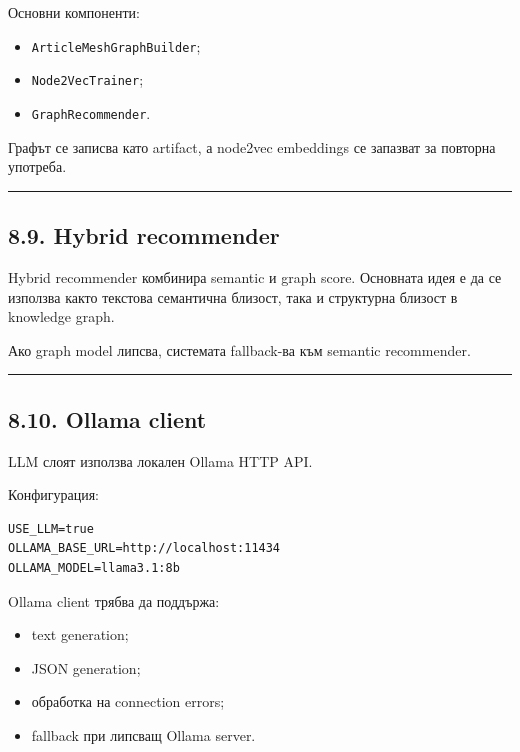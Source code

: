 \documentclass[12pt,a4paper]{article}
\providecommand{\tightlist}{\setlength{\itemsep}{0pt}\setlength{\parskip}{0pt}}
\begin{document}
Основни компоненти:

\begin{itemize}
\tightlist
\item
  \texttt{ArticleMeshGraphBuilder};
\item
  \texttt{Node2VecTrainer};
\item
  \texttt{GraphRecommender}.
\end{itemize}

Графът се записва като artifact, а node2vec embeddings се запазват за повторна употреба.

\vspace{0.5em}\hrule\vspace{1.0em}

\subsection{8.9. Hybrid recommender}\label{hybrid-recommender-1}

Hybrid recommender комбинира semantic и graph score. Основната идея е да се използва както текстова семантична близост, така и структурна близост в knowledge graph.

Ако graph model липсва, системата fallback-ва към semantic recommender.

\vspace{0.5em}\hrule\vspace{1.0em}

\subsection{8.10. Ollama client}\label{ollama-client}

LLM слоят използва локален Ollama HTTP API.

Конфигурация:

\begin{verbatim}
USE_LLM=true
OLLAMA_BASE_URL=http://localhost:11434
OLLAMA_MODEL=llama3.1:8b
\end{verbatim}

Ollama client трябва да поддържа:

\begin{itemize}
\tightlist
\item
  text generation;
\item
  JSON generation;
\item
  обработка на connection errors;
\item
  fallback при липсващ Ollama server.
\end{itemize}
\end{document}
